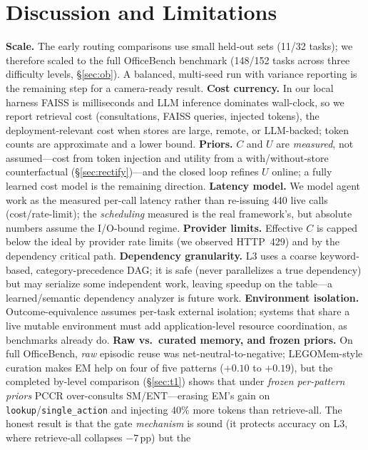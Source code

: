 \documentclass[10pt,twocolumn]{article}
\newcommand{\code}[1]{\texttt{\small #1}}
\begin{document}
\section{Discussion and Limitations}
\textbf{Scale.} The early routing comparisons use small held-out sets (11/32
tasks); we therefore scaled to the full OfficeBench benchmark (148/152 tasks across
three difficulty levels, \S\ref{sec:ob}). A balanced, multi-seed run with variance
reporting is the remaining step for a camera-ready result. \textbf{Cost
currency.} In our local harness FAISS is milliseconds and LLM inference dominates
wall-clock, so we report retrieval cost (consultations, FAISS queries, injected
tokens), the deployment-relevant cost when stores are large, remote, or LLM-backed;
token counts are approximate and a lower bound. \textbf{Priors.} $C$ and $U$ are
\emph{measured}, not assumed---cost from token injection and utility from a
with/without-store counterfactual (\S\ref{sec:rectify})---and the closed loop refines
$U$ online; a fully learned cost model is the remaining direction. \textbf{Latency model.} We model agent work as the measured
per-call latency rather than re-issuing 440 live calls (cost/rate-limit); the
\emph{scheduling} measured is the real framework's, but absolute numbers assume the
I/O-bound regime. \textbf{Provider limits.} Effective $C$ is capped below the ideal
by provider rate limits (we observed HTTP~429) and by the dependency critical path.
\textbf{Dependency granularity.} L3 uses a coarse keyword-based, category-precedence
DAG; it is safe (never parallelizes a true dependency) but may serialize some
independent work, leaving speedup on the table---a learned/semantic dependency
analyzer is future work. \textbf{Environment isolation.} Outcome-equivalence
assumes per-task external isolation; systems that share a live mutable environment
must add application-level resource coordination, as benchmarks already do.
\textbf{Raw vs.\ curated memory, and frozen priors.} On full OfficeBench, \emph{raw}
episodic reuse was net-neutral-to-negative; LEGOMem-style curation makes EM help on four
of five patterns ($+0.10$ to $+0.19$), but the completed by-level comparison
(\S\ref{sec:t1}) shows that under \emph{frozen per-pattern priors} PCCR over-consults
SM/ENT---erasing EM's gain on \code{lookup}/\code{single\_action} and injecting $40\%$
more tokens than retrieve-all. The honest result is that the gate \emph{mechanism} is
sound (it protects accuracy on L3, where retrieve-all collapses $-7$\,pp) but the
\end{document}
